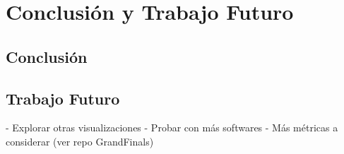 \chapter{Conclusión y Trabajo Futuro}
\section{Conclusión}

\section{Trabajo Futuro}

- Explorar otras visualizaciones
- Probar con más softwares
- Más métricas a considerar (ver repo GrandFinals)